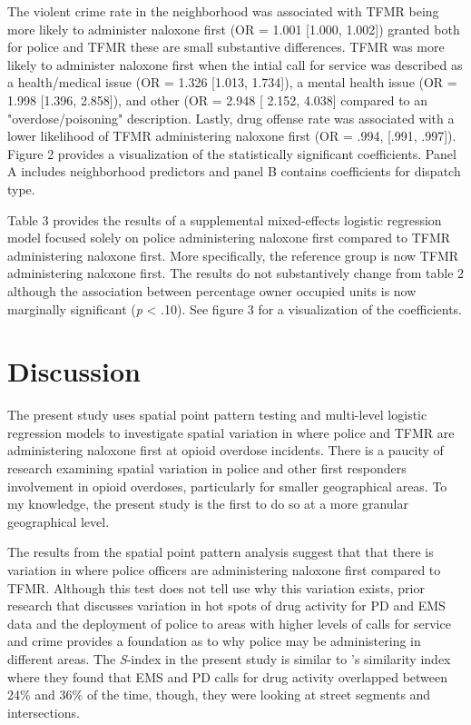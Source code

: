 The violent crime rate in the neighborhood was associated with TFMR being more likely to administer naloxone first (OR = 1.001 [1.000, 1.002]) granted both for police and TFMR these are small substantive differences. TFMR was more likely to administer naloxone first when the intial call for service was described as a health/medical issue (OR = 1.326 [1.013, 1.734]), a mental health issue (OR = 1.998 [1.396, 2.858]), and other (OR = 2.948 [ 2.152, 4.038] compared to an "overdose/poisoning" description. Lastly, drug offense rate was associated with a lower likelihood of TFMR administering naloxone first (OR = .994, [.991, .997]). Figure 2 provides a visualization of the statistically significant coefficients. Panel A includes neighborhood predictors and panel B contains coefficients for dispatch type.

Table 3 provides the results of a supplemental mixed-effects logistic regression model focused solely on police administering naloxone first compared to TFMR administering naloxone first. More specifically, the reference group is now TFMR administering naloxone first. The results do not substantively change from table 2 although the association between percentage owner occupied units is now marginally significant (\textit{p} < .10). See figure 3 for a visualization of the coefficients.

\section{\centering Discussion}
The present study uses spatial point pattern testing and multi-level logistic regression models to investigate spatial variation in where police and TFMR are administering naloxone first at opioid overdose incidents. There is a paucity of research examining spatial variation in police and other first responders involvement in opioid overdoses, particularly for smaller geographical areas. To my knowledge, the present study is the first to do so at a more granular geographical level. 

The results from the spatial point pattern analysis suggest that that there is variation in where police officers are administering naloxone first compared to TFMR. Although this test does not tell use why this variation exists, prior research that discusses variation in hot spots of drug activity for PD and EMS data \parencite{hibdon_concentration_2017, hibdon_going_2021} and the deployment of police to areas with higher levels of calls for service and crime \parencite{engel_police_2003} provides a foundation as to why police may be administering in different areas. The \textit{S}-index in the present study is similar to \textcite{hibdon_concentration_2017}'s similarity index where they found that EMS and PD calls for drug activity overlapped between 24\% and 36\% of the time, though, they were looking at street segments and intersections. 

